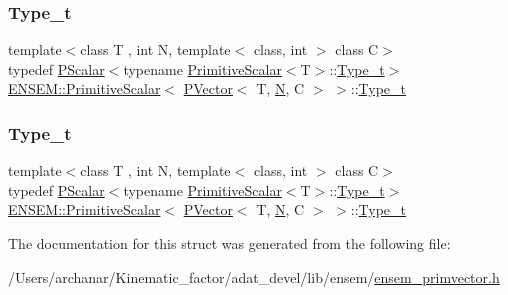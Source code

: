\subsubsection{\texorpdfstring{Type\_t}{Type\_t}\hspace{0.1cm}{\footnotesize\ttfamily [1/2]}}
{\footnotesize\ttfamily template$<$class T , int N, template$<$ class, int $>$ class C$>$ \\
typedef \mbox{\hyperlink{classENSEM_1_1PScalar}{P\+Scalar}}$<$typename \mbox{\hyperlink{structENSEM_1_1PrimitiveScalar}{Primitive\+Scalar}}$<$T$>$\+::\mbox{\hyperlink{structENSEM_1_1PrimitiveScalar_3_01PVector_3_01T_00_01N_00_01C_01_4_01_4_afc0dde305bcae3b52f619989d06ed843}{Type\+\_\+t}}$>$ \mbox{\hyperlink{structENSEM_1_1PrimitiveScalar}{E\+N\+S\+E\+M\+::\+Primitive\+Scalar}}$<$ \mbox{\hyperlink{classENSEM_1_1PVector}{P\+Vector}}$<$ T, \mbox{\hyperlink{operator__name__util_8cc_a7722c8ecbb62d99aee7ce68b1752f337}{N}}, C $>$ $>$\+::\mbox{\hyperlink{structENSEM_1_1PrimitiveScalar_3_01PVector_3_01T_00_01N_00_01C_01_4_01_4_afc0dde305bcae3b52f619989d06ed843}{Type\+\_\+t}}}

\mbox{\label{structENSEM_1_1PrimitiveScalar_3_01PVector_3_01T_00_01N_00_01C_01_4_01_4_afc0dde305bcae3b52f619989d06ed843}} 
\subsubsection{\texorpdfstring{Type\_t}{Type\_t}\hspace{0.1cm}{\footnotesize\ttfamily [2/2]}}
{\footnotesize\ttfamily template$<$class T , int N, template$<$ class, int $>$ class C$>$ \\
typedef \mbox{\hyperlink{classENSEM_1_1PScalar}{P\+Scalar}}$<$typename \mbox{\hyperlink{structENSEM_1_1PrimitiveScalar}{Primitive\+Scalar}}$<$T$>$\+::\mbox{\hyperlink{structENSEM_1_1PrimitiveScalar_3_01PVector_3_01T_00_01N_00_01C_01_4_01_4_afc0dde305bcae3b52f619989d06ed843}{Type\+\_\+t}}$>$ \mbox{\hyperlink{structENSEM_1_1PrimitiveScalar}{E\+N\+S\+E\+M\+::\+Primitive\+Scalar}}$<$ \mbox{\hyperlink{classENSEM_1_1PVector}{P\+Vector}}$<$ T, \mbox{\hyperlink{operator__name__util_8cc_a7722c8ecbb62d99aee7ce68b1752f337}{N}}, C $>$ $>$\+::\mbox{\hyperlink{structENSEM_1_1PrimitiveScalar_3_01PVector_3_01T_00_01N_00_01C_01_4_01_4_afc0dde305bcae3b52f619989d06ed843}{Type\+\_\+t}}}



The documentation for this struct was generated from the following file\+:\begin{DoxyCompactItemize}
\item 
/\+Users/archanar/\+Kinematic\+\_\+factor/adat\+\_\+devel/lib/ensem/\mbox{\hyperlink{lib_2ensem_2ensem__primvector_8h}{ensem\+\_\+primvector.\+h}}\end{DoxyCompactItemize}
